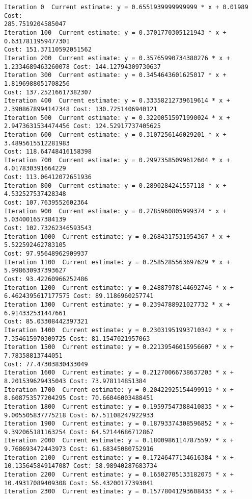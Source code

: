 \documentclass[11pt]{article}
\begin{document}
    \begin{Verbatim}[commandchars=\\\{\}]
Iteration 0  Current estimate: y = 0.6551939999999999 * x + 0.01989 Cost:
285.7519204585047
Iteration 100  Current estimate: y = 0.3701770305121943 * x + 0.6317811959477301
Cost: 151.37110592051562
Iteration 200  Current estimate: y = 0.35765990734380276 * x +
1.2334689463260078 Cost: 144.12794309730637
Iteration 300  Current estimate: y = 0.3454643601625017 * x + 1.8196988051708256
Cost: 137.25216617382307
Iteration 400  Current estimate: y = 0.33358212739619614 * x +
2.3908678994147348 Cost: 130.7251406940121
Iteration 500  Current estimate: y = 0.32200515971990024 * x +
2.9473631534474456 Cost: 124.52917737405625
Iteration 600  Current estimate: y = 0.3107256146029201 * x + 3.4895615512281983
Cost: 118.64748416158398
Iteration 700  Current estimate: y = 0.29973585099612604 * x + 4.017830391664229
Cost: 113.06412072651936
Iteration 800  Current estimate: y = 0.2890284241557118 * x + 4.532527537428348
Cost: 107.7639552602364
Iteration 900  Current estimate: y = 0.2785960805999374 * x + 5.034001657384139
Cost: 102.73262346593543
Iteration 1000  Current estimate: y = 0.2684317531954367 * x + 5.522592462783105
Cost: 97.95648962909937
Iteration 1100  Current estimate: y = 0.2585285563697629 * x + 5.998630937393627
Cost: 93.42260966252486
Iteration 1200  Current estimate: y = 0.24887978144692746 * x +
6.4624395617177575 Cost: 89.1186960257741
Iteration 1300  Current estimate: y = 0.2394788921027732 * x + 6.914332531447661
Cost: 85.03308442397321
Iteration 1400  Current estimate: y = 0.23031951993710342 * x +
7.354615970309725 Cost: 81.1547021957063
Iteration 1500  Current estimate: y = 0.22139546015956607 * x + 7.78358813744051
Cost: 77.47303830433049
Iteration 1600  Current estimate: y = 0.21270066738637203 * x +
8.201539629435043 Cost: 73.978114851384
Iteration 1700  Current estimate: y = 0.20422925154499919 * x +
8.608753577204295 Cost: 70.66046003488451
Iteration 1800  Current estimate: y = 0.19597547388410835 * x +
9.005505837775218 Cost: 67.51108247922933
Iteration 1900  Current estimate: y = 0.18793374308596852 * x +
9.392065181163254 Cost: 64.52144686712867
Iteration 2000  Current estimate: y = 0.18009861147875597 * x +
9.768693472443973 Cost: 61.68345080752916
Iteration 2100  Current estimate: y = 0.17246477134616384 * x +
10.135645849147087 Cost: 58.98940287683734
Iteration 2200  Current estimate: y = 0.16502705133182075 * x +
10.49317089409308 Cost: 56.43200177393041
Iteration 2300  Current estimate: y = 0.15778041293608433 * x +

\end{Verbatim}
\end{document}
